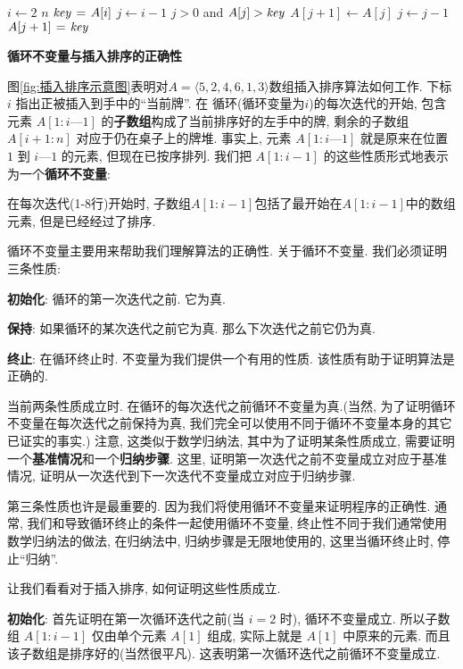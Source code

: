 \documentclass[oneside,10pt,fontset=none]{ctexbook}
\numberwithin{definition}{chapter}
\numberwithin{theorem}{chapter}
\numberwithin{proof}{chapter}
\begin{document}
\begin{codebox}
\li \For $i \gets 2$ \To $n$
\li \Do
$\id{key} \gets A[i]$
\li {}
\li $j \gets i-1$
\li \While $j > 0$ and $A[j] > \id{key}$
\li \Do
$A[j+1] \gets A[j]$
\li $j \gets j-1$
\End
\li $A[j+1] \gets \id{key}$
\End
\end{codebox}

\textbf{循环不变量与插入排序的正确性}

图\ref{fig:插入排序示意图}表明对$A=\langle 5, 2, 4, 6, 1, 3\rangle$数组插入排序算法如何工作. 下标 $i$ 指出正被插入到手中的``当前牌''. 在  循环(循环变量为$i$)的每次迭代的开始, 包含元素 $A[1:i—1]$ 的\textbf{子数组}构成了当前排序好的左手中的牌, 剩余的子数组 $A[i+1:n]$ 对应于仍在桌子上的牌堆. 事实上, 元素 $A[1:i—1]$ 就是原来在位置 $1$ 到 $i—1$ 的元素, 但现在已按序排列. 我们把 $A[1:i-1]$ 的这些性质形式地表示为一个\textbf{循环不变量}:



在每次迭代(1-8行)开始时, 子数组$A[1:i-1]$包括了最开始在$A[1:i-1]$中的数组元素, 但是已经经过了排序.

循环不变量主要用来帮助我们理解算法的正确性. 关于循环不变量. 我们必须证明三条性质:

\textbf{初始化}: 循环的第一次迭代之前. 它为真.

\textbf{保持}: 如果循环的某次迭代之前它为真. 那么下次迭代之前它仍为真.

\textbf{终止}: 在循环终止时. 不变量为我们提供一个有用的性质. 该性质有助于证明算法是正确的.

当前两条性质成立时. 在循环的每次迭代之前循环不变量为真.(当然, 为了证明循环不变量在每次迭代之前保持为真, 我们完全可以使用不同于循环不变量本身的其它已证实的事实.) 注意, 这类似于数学归纳法, 其中为了证明某条性质成立, 需要证明一个\textbf{基准情况}和一个\textbf{归纳步骤}. 这里, 证明第一次迭代之前不变量成立对应于基准情况, 证明从一次迭代到下一次迭代不变量成立对应于归纳步骤.

第三条性质也许是最重要的. 因为我们将使用循环不变量来证明程序的正确性. 通常, 我们和导致循环终止的条件一起使用循环不变量, 终止性不同于我们通常使用数学归纳法的做法, 在归纳法中, 归纳步骤是无限地使用的, 这里当循环终止时, 停止``归纳''.

让我们看看对于插入排序, 如何证明这些性质成立.

\textbf{初始化}: 首先证明在第一次循环迭代之前(当 $i=2$ 时), 循环不变量成立. 所以子数组 $A[1:i-1]$ 仅由单个元素 $A[1]$ 组成, 实际上就是 $A[1]$ 中原来的元素. 而且该子数组是排序好的(当然很平凡). 这表明第一次循环迭代之前循环不变量成立.
\end{document}
